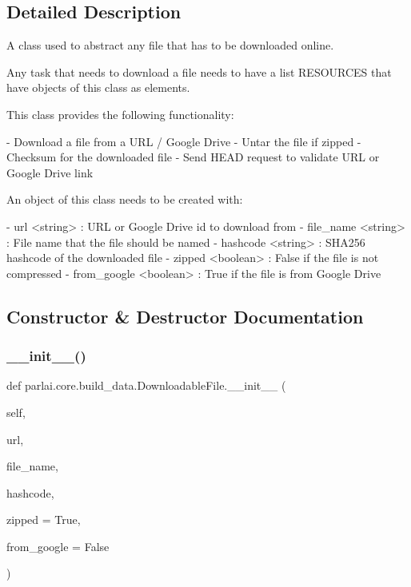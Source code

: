\subsection{Detailed Description}
\begin{DoxyVerb}A class used to abstract any file that has to be downloaded online.

Any task that needs to download a file needs to have a list RESOURCES
that have objects of this class as elements.

This class provides the following functionality:

- Download a file from a URL / Google Drive
- Untar the file if zipped
- Checksum for the downloaded file
- Send HEAD request to validate URL or Google Drive link

An object of this class needs to be created with:

- url <string> : URL or Google Drive id to download from
- file_name <string> : File name that the file should be named
- hashcode <string> : SHA256 hashcode of the downloaded file
- zipped <boolean> : False if the file is not compressed
- from_google <boolean> : True if the file is from Google Drive
\end{DoxyVerb}
 

\subsection{Constructor \& Destructor Documentation}
\mbox{\label{classparlai_1_1core_1_1build__data_1_1DownloadableFile_a674bba356b2fba56bb013b773233f2a7}} 
\subsubsection{\texorpdfstring{\+\_\+\+\_\+init\+\_\+\+\_\+()}{\_\_init\_\_()}}
{\footnotesize\ttfamily def parlai.\+core.\+build\+\_\+data.\+Downloadable\+File.\+\_\+\+\_\+init\+\_\+\+\_\+ (\begin{DoxyParamCaption}\item[{}]{self,  }\item[{}]{url,  }\item[{}]{file\+\_\+name,  }\item[{}]{hashcode,  }\item[{}]{zipped = {\ttfamily True},  }\item[{}]{from\+\_\+google = {\ttfamily False} }\end{DoxyParamCaption})}



